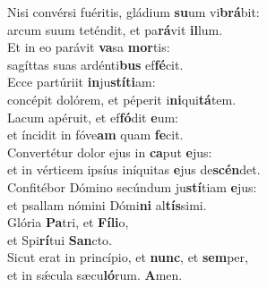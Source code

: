 \oddverse Nisi convérsi fuéritis, gládium \textbf{su}um vi\textbf{brá}bit:~\*\\
\oddverse arcum suum teténdit, et pa\textbf{rá}vit \textbf{il}lum.\\
\evenverse Et in eo parávit \textbf{va}sa \textbf{mor}tis:~\*\\
\evenverse sagíttas suas ardénti\textbf{bus} ef\textbf{fé}cit.\\
\oddverse Ecce partúriit \textbf{in}ju\textbf{stí}\textbf{ti}am:~\*\\
\oddverse concépit dolórem, et péperit i\textbf{ni}qui\textbf{tá}tem.\\
\evenverse Lacum apéruit, et ef\textbf{fó}dit \textbf{e}um:~\*\\
\evenverse et íncidit in fóve\textbf{am} quam \textbf{fe}cit.\\
\oddverse Convertétur dolor ejus in \textbf{ca}put \textbf{e}jus:~\*\\
\oddverse et in vérticem ipsíus iníquitas \textbf{e}jus de\textbf{scén}det.\\
\evenverse Confitébor Dómino secúndum ju\textbf{stí}tiam \textbf{e}jus:~\*\\
\evenverse et psallam nómini Dómi\textbf{ni} al\textbf{tís}simi.\\
\oddverse Glória \textbf{Pa}tri, et \textbf{Fí}\textbf{li}o,~\*\\
\oddverse et Spi\textbf{rí}tui \textbf{San}cto.\\
\evenverse Sicut erat in princípio, et \textbf{nunc}, et \textbf{sem}per,~\*\\
\evenverse et in sǽcula sæcu\textbf{ló}rum. \textbf{A}men.\\
